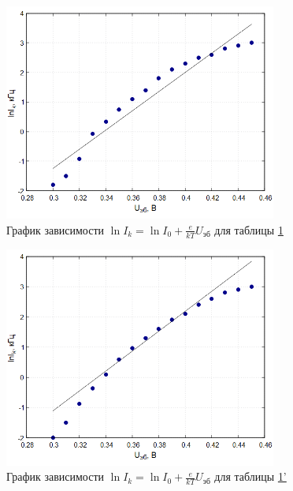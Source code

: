 \begin{figure}
\centering
\includegraphics[width=0.8\textwidth]{Plot1.png}
\caption{График зависимости $\ln I_k = \ln I_0 + \frac{e}{kT}U_{\text{эб}}$ для таблицы \hyperref[tabl:1]{1}}
\label{fig:plot1}
\end{figure}

\begin{figure}
\centering
\includegraphics[width=0.8\textwidth]{Plot2.png}
\caption{График зависимости $\ln I_k = \ln I_0 + \frac{e}{kT}U_{\text{эб}}$ для таблицы \hyperref[tabl:2]{1'}}
\label{fig:plot2}
\end{figure}

